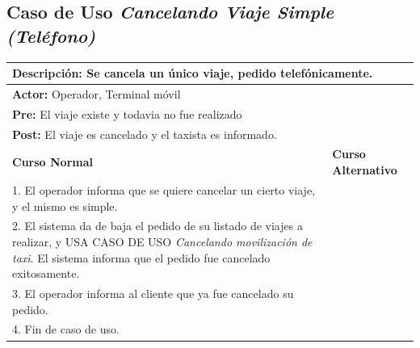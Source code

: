 \documentclass[a4paper]{article}
\begin{document}
\subsection{Caso de Uso \textit{Cancelando Viaje Simple (Tel\'efono)}}
\begin{center}
\begin{tabular}{|p{10cm} | p{6cm}|}
\hline
\multicolumn{2}{|p{16cm}|}{\textbf{Descripci\'on:} Se cancela un \'unico viaje, pedido telef\'onicamente. } \\
\hline
\multicolumn{2}{|l|}{\textbf{Actor:} Operador, Terminal m\'ovil} \\
\hline
\multicolumn{2}{|l|}{\textbf{Pre:} El viaje existe y todavia no fue realizado} \\
\hline
\multicolumn{2}{|p{16cm}|}{\textbf{Post:} El viaje es cancelado y el taxista es informado.}\\
\hline
\textbf{Curso Normal}  & \textbf{Curso Alternativo} \\ \hline
1. El operador informa que se quiere cancelar un cierto viaje, y el mismo es simple. & \\ \hline
2. El sistema da de baja el pedido de su listado de viajes a realizar, y USA CASO DE USO \textit{Cancelando movilizaci\'on de taxi}. El sistema informa que el pedido fue cancelado exitosamente. & \\ \hline
3. El operador informa al cliente que ya fue cancelado su pedido. & \\ \hline
4. Fin de caso de uso. & \\ \hline
\end{tabular}
\end{center}
\end{document}

